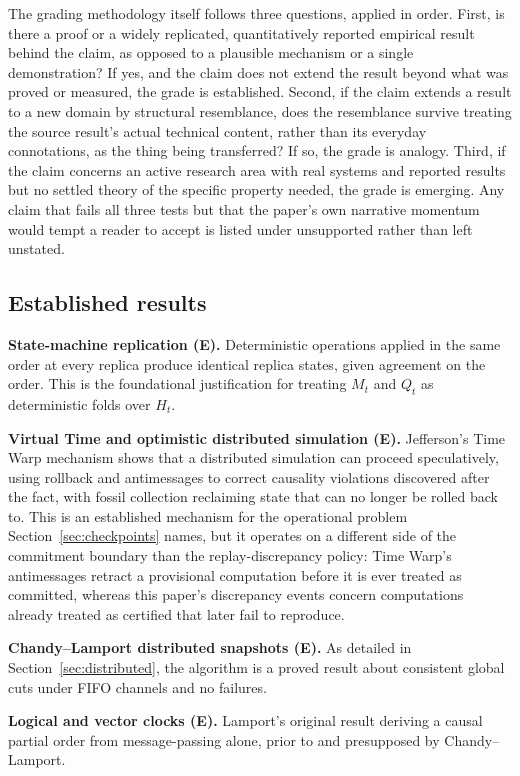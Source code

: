 \documentclass[11pt]{article}
\begin{document}
The grading methodology itself follows three questions, applied in order. First, is there a proof or a widely replicated, quantitatively reported empirical result behind the claim, as opposed to a plausible mechanism or a single demonstration? If yes, and the claim does not extend the result beyond what was proved or measured, the grade is established. Second, if the claim extends a result to a new domain by structural resemblance, does the resemblance survive treating the source result's actual technical content, rather than its everyday connotations, as the thing being transferred? If so, the grade is analogy. Third, if the claim concerns an active research area with real systems and reported results but no settled theory of the specific property needed, the grade is emerging. Any claim that fails all three tests but that the paper's own narrative momentum would tempt a reader to accept is listed under unsupported rather than left unstated.

\subsection{Established results}
\label{sec:established}

\textbf{State-machine replication (E).} Deterministic operations applied in the same order at every replica produce identical replica states, given agreement on the order. This is the foundational justification for treating $M_t$ and $Q_t$ as deterministic folds over $H_t$.

\textbf{Virtual Time and optimistic distributed simulation (E).} Jefferson's Time Warp mechanism shows that a distributed simulation can proceed speculatively, using rollback and antimessages to correct causality violations discovered after the fact, with fossil collection reclaiming state that can no longer be rolled back to. This is an established mechanism for the operational problem Section~\ref{sec:checkpoints} names, but it operates on a different side of the commitment boundary than the replay-discrepancy policy: Time Warp's antimessages retract a provisional computation before it is ever treated as committed, whereas this paper's discrepancy events concern computations already treated as certified that later fail to reproduce.

\textbf{Chandy--Lamport distributed snapshots (E).} As detailed in Section~\ref{sec:distributed}, the algorithm is a proved result about consistent global cuts under FIFO channels and no failures.

\textbf{Logical and vector clocks (E).} Lamport's original result deriving a causal partial order from message-passing alone, prior to and presupposed by Chandy--Lamport.
\end{document}
